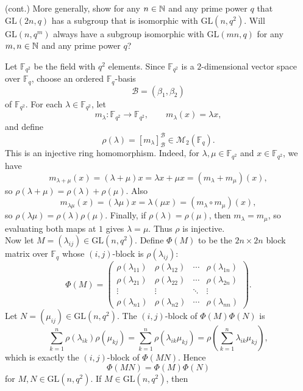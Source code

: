 \documentclass[../Odyssey_Project.tex]{subfiles}
\begin{document}
\begin{exercise}
\label{ex:4.4}
(cont.) More generally, show for any $n \in \mathbb{N}$ and any prime power $q$ that $\mathrm{GL}(2n, q)$ has a subgroup that is isomorphic with $\mathrm{GL}(n, q^2)$. Will $\mathrm{GL}(n, q^m)$ always have a subgroup isomorphic with $\mathrm{GL}(mn, q)$ for any $m, n \in \mathbb{N}$ and any prime power $q$?
\end{exercise}
\begin{solution}
Let $\mathbb{F}_{q^2}$ be the field with $q^2$ elements. Since $\mathbb{F}_{q^2}$ is a $2$-dimensional vector space over $\mathbb{F}_q$, choose an ordered $\mathbb{F}_q$-basis
\[
    \mathcal B=(\beta_1,\beta_2)
\]
of $\mathbb{F}_{q^2}$. For each $\lambda\in \mathbb{F}_{q^2}$, let
\[
    m_\lambda\colon \mathbb{F}_{q^2}\to \mathbb{F}_{q^2},
    \qquad
    m_\lambda(x)=\lambda x,
\]
and define
\[
    \rho(\lambda)=[m_\lambda]_{\mathcal B}^{\mathcal B}
    \in \mathcal{M}_2(\mathbb{F}_q).
\]
This is an injective ring homomorphism. Indeed, for $\lambda,\mu\in \mathbb{F}_{q^2}$ and $x\in \mathbb{F}_{q^2}$, we have
\[
    m_{\lambda+\mu}(x)=(\lambda+\mu)x=\lambda x+\mu x=(m_\lambda+m_\mu)(x),
\]
so $\rho(\lambda+\mu)=\rho(\lambda)+\rho(\mu)$. Also
\[
    m_{\lambda\mu}(x)=(\lambda\mu)x=\lambda(\mu x)=(m_\lambda\circ m_\mu)(x),
\]
so $\rho(\lambda\mu)=\rho(\lambda)\rho(\mu)$. Finally, if $\rho(\lambda)=\rho(\mu)$, then $m_\lambda=m_\mu$, so evaluating both maps at $1$ gives $\lambda=\mu$. Thus $\rho$ is injective.\\
Now let $M=(\lambda_{ij})\in \mathrm{GL}(n,q^2)$. Define $\Phi(M)$ to be the $2n\times 2n$ block matrix over $\mathbb{F}_q$ whose $(i,j)$-block is $\rho(\lambda_{ij})$:
\[
    \Phi(M)=
    \begin{pmatrix}
        \rho(\lambda_{11})&\rho(\lambda_{12})&\cdots&\rho(\lambda_{1n})\\
        \rho(\lambda_{21})&\rho(\lambda_{22})&\cdots&\rho(\lambda_{2n})\\
        \vdots&\vdots&\ddots&\vdots\\
        \rho(\lambda_{n1})&\rho(\lambda_{n2})&\cdots&\rho(\lambda_{nn})
    \end{pmatrix}.
\]
Let $N=(\mu_{ij})\in \mathrm{GL}(n,q^2)$. The $(i,j)$-block of $\Phi(M)\Phi(N)$ is
\[
    \sum_{k=1}^n \rho(\lambda_{ik})\rho(\mu_{kj})
    =
    \sum_{k=1}^n \rho(\lambda_{ik}\mu_{kj})
    =
    \rho\left(\sum_{k=1}^n \lambda_{ik}\mu_{kj}\right),
\]
which is exactly the $(i,j)$-block of $\Phi(MN)$. Hence
\[
    \Phi(MN)=\Phi(M)\Phi(N)
\]
for $M,N\in \mathrm{GL}(n,q^2)$. If $M\in \mathrm{GL}(n,q^2)$, then

\end{solution}
\end{document}
